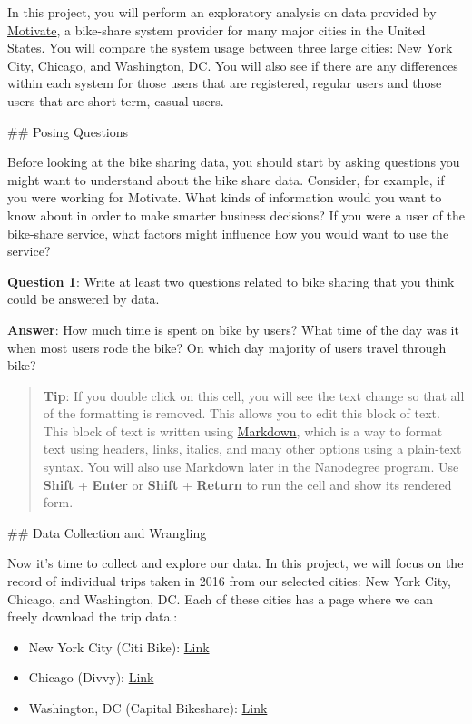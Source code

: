 \documentclass[11pt]{article}
\providecommand{\tightlist}{%
      \setlength{\itemsep}{0pt}\setlength{\parskip}{0pt}}
\begin{document}
In this project, you will perform an exploratory analysis on data
provided by \href{https://www.motivateco.com/}{Motivate}, a bike-share
system provider for many major cities in the United States. You will
compare the system usage between three large cities: New York City,
Chicago, and Washington, DC. You will also see if there are any
differences within each system for those users that are registered,
regular users and those users that are short-term, casual users.

     \#\# Posing Questions

Before looking at the bike sharing data, you should start by asking
questions you might want to understand about the bike share data.
Consider, for example, if you were working for Motivate. What kinds of
information would you want to know about in order to make smarter
business decisions? If you were a user of the bike-share service, what
factors might influence how you would want to use the service?

\textbf{Question 1}: Write at least two questions related to bike
sharing that you think could be answered by data.

\textbf{Answer}: How much time is spent on bike by users? What time of
the day was it when most users rode the bike? On which day majority of
users travel through bike?

\begin{quote}
\textbf{Tip}: If you double click on this cell, you will see the text
change so that all of the formatting is removed. This allows you to edit
this block of text. This block of text is written using
\href{http://daringfireball.net/projects/markdown/syntax}{Markdown},
which is a way to format text using headers, links, italics, and many
other options using a plain-text syntax. You will also use Markdown
later in the Nanodegree program. Use \textbf{Shift} + \textbf{Enter} or
\textbf{Shift} + \textbf{Return} to run the cell and show its rendered
form.
\end{quote}

     \#\# Data Collection and Wrangling

Now it's time to collect and explore our data. In this project, we will
focus on the record of individual trips taken in 2016 from our selected
cities: New York City, Chicago, and Washington, DC. Each of these cities
has a page where we can freely download the trip data.:

\begin{itemize}
\tightlist
\item
  New York City (Citi Bike):
  \href{https://www.citibikenyc.com/system-data}{Link}
\item
  Chicago (Divvy): \href{https://www.divvybikes.com/system-data}{Link}
\item
  Washington, DC (Capital Bikeshare):
  \href{https://www.capitalbikeshare.com/system-data}{Link}
\end{itemize}
\end{document}
